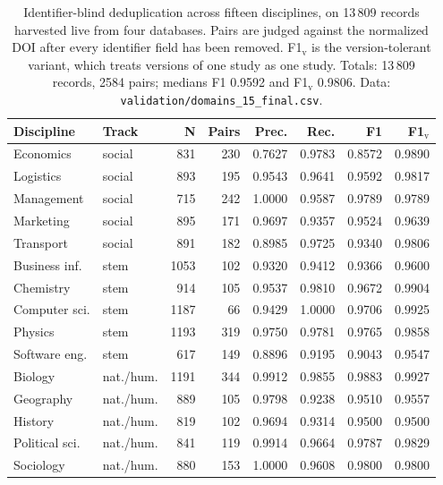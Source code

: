 \documentclass[final,5p,times,twocolumn]{elsarticle}
\begin{document}
\begin{table}[t]
\caption{Identifier-blind deduplication across fifteen disciplines, on 13\,809
records harvested live from four databases. Pairs are judged against the
normalized DOI after every identifier field has been removed. F1$_{\text{v}}$
is the version-tolerant variant, which treats versions of one study as one
study. Totals: 13\,809 records, 2584 pairs; medians F1 0.9592 and
F1$_{\text{v}}$ 0.9806. Data: \texttt{validation/domains\_15\_final.csv}.}
\label{tab:domains}
\small
\begin{tabular}{@{}llrrrrrr@{}}
\toprule
\textbf{Discipline} & \textbf{Track} & \textbf{N} & \textbf{Pairs} &
\textbf{Prec.} & \textbf{Rec.} & \textbf{F1} & \textbf{F1$_{\text{v}}$} \\
\midrule
Economics & social & 831 & 230 & 0.7627 & 0.9783 & 0.8572 & 0.9890 \\
Logistics & social & 893 & 195 & 0.9543 & 0.9641 & 0.9592 & 0.9817 \\
Management & social & 715 & 242 & 1.0000 & 0.9587 & 0.9789 & 0.9789 \\
Marketing & social & 895 & 171 & 0.9697 & 0.9357 & 0.9524 & 0.9639 \\
Transport & social & 891 & 182 & 0.8985 & 0.9725 & 0.9340 & 0.9806 \\
Business inf. & stem & 1053 & 102 & 0.9320 & 0.9412 & 0.9366 & 0.9600 \\
Chemistry & stem & 914 & 105 & 0.9537 & 0.9810 & 0.9672 & 0.9904 \\
Computer sci. & stem & 1187 & 66 & 0.9429 & 1.0000 & 0.9706 & 0.9925 \\
Physics & stem & 1193 & 319 & 0.9750 & 0.9781 & 0.9765 & 0.9858 \\
Software eng. & stem & 617 & 149 & 0.8896 & 0.9195 & 0.9043 & 0.9547 \\
Biology & nat./hum. & 1191 & 344 & 0.9912 & 0.9855 & 0.9883 & 0.9927 \\
Geography & nat./hum. & 889 & 105 & 0.9798 & 0.9238 & 0.9510 & 0.9557 \\
History & nat./hum. & 819 & 102 & 0.9694 & 0.9314 & 0.9500 & 0.9500 \\
Political sci. & nat./hum. & 841 & 119 & 0.9914 & 0.9664 & 0.9787 & 0.9829 \\
Sociology & nat./hum. & 880 & 153 & 1.0000 & 0.9608 & 0.9800 & 0.9800 \\
\bottomrule
\end{tabular}
\end{table}
\end{document}
